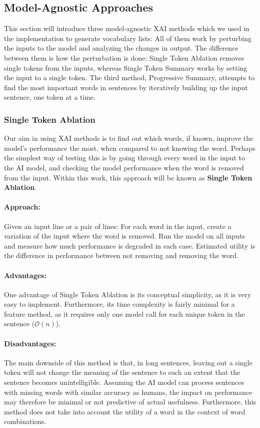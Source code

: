 \subsection{Model-Agnostic Approaches}
This section will introduce three model-agnostic XAI methods which we used in the implementation to generate vocabulary lists:
All of them work by perturbing the inputs to the model and analyzing the changes in output.
The difference between them is how the perturbation is done:
Single Token Ablation removes single tokens from the inputs, whereas Single Token Summary works by setting the input to a single token.
The third method, Progressive Summary, attempts to find the most important words in sentences by iteratively building up the input sentence, one token at a time.

\subsubsection{Single Token Ablation}
Our aim in using XAI methods is to find out which words, if known, improve the model's performance the most, when compared to not knowing the word.
Perhaps the simplest way of testing this is by going through every word in the input to the AI model, and checking the model performance when the word is removed from the input.
Within this work, this approach will be known as \textbf{Single Token Ablation}.

\paragraph{Approach:}
Given an input line or a pair of lines:
For each word in the input, create a variation of the input where the word is removed.
Run the model on all inputs and measure how much performance is degraded in each case.
Estimated utility is the difference in performance between not removing and removing the word.

\paragraph{Advantages:}
One advantage of Single Token Ablation is its conceptual simplicity, as it is very easy to implement.
Furthermore, its time complexity is fairly minimal for a feature method, as it requires only one model call for each unique token in the sentence ($\mathcal{O}(n)$).

\paragraph{Disadvantages:}
The main downside of this method is that, in long sentences, leaving out a single token will not change the meaning of the sentence to such an extent that the sentence becomes unintelligible.
Assuming the AI model can process sentences with missing words with similar accuracy as humans, the impact on performance may therefore be minimal or not predictive of actual usefulness.
Furthermore, this method does not take into account the utility of a word in the context of word combinations.

